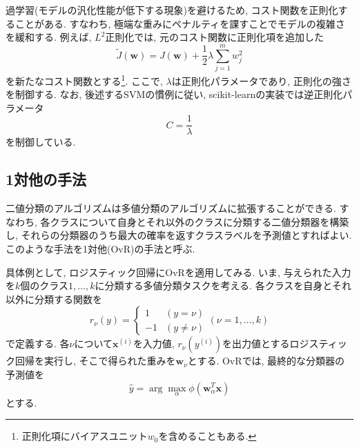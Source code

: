 \documentclass[uplatex]{jsarticle}
\theoremstyle{definition}
\numberwithin{equation}{section}
\begin{document}
過学習(モデルの汎化性能が低下する現象)を避けるため, コスト関数を正則化することがある.
すなわち, 極端な重みにペナルティを課すことでモデルの複雑さを緩和する.
例えば, $L^{2}$正則化では, 元のコスト関数に正則化項を追加した
\begin{equation}
    \tilde{J}(\bm{w}) = J(\bm{w}) + \frac{1}{2}\lambda\sum_{j = 1}^{m} w_{j}^{2}
\end{equation}
を新たなコスト関数とする\footnote{正則化項にバイアスユニット$w_{0}$を含めることもある.}.
ここで, $\lambda$は正則化パラメータであり, 正則化の強さを制御する.
なお, 後述するSVMの慣例に従い, scikit-learnの実装では逆正則化パラメータ
\begin{equation}
    C = \frac{1}{\lambda}
\end{equation}
を制御している.

\subsection{1対他の手法}
二値分類のアルゴリズムは多値分類のアルゴリズムに拡張することができる.
すなわち, 各クラスについて自身とそれ以外のクラスに分類する二値分類器を構築し, それらの分類器のうち最大の確率を返すクラスラベルを予測値とすればよい.
このような手法を1対他(OvR)の手法と呼ぶ.

具体例として, ロジスティック回帰にOvRを適用してみる.
いま, 与えられた入力を$k$個のクラス$1, \dots, k$に分類する多値分類タスクを考える.
各クラスを自身とそれ以外に分類する関数を
\begin{equation}
    r_{\nu}(y) = 
    \begin{cases}
        1 & (y = \nu) \\
        -1 & (y \neq \nu)
    \end{cases}
    (\nu = 1, \dots, k)
\end{equation}
で定義する.
各$\nu$について$\bm{x}^{(i)}$を入力値, $r_{\nu}(y^{(i)})$を出力値とするロジスティック回帰を実行し,
そこで得られた重みを$\bm{w}_{\nu}$とする.
OvRでは, 最終的な分類器の予測値を
\begin{equation}
    \hat{y} = \arg \max_{\alpha} \phi(\bm{w}_{\alpha}^{T}\bm{x})
\end{equation}
とする.
\end{document}
